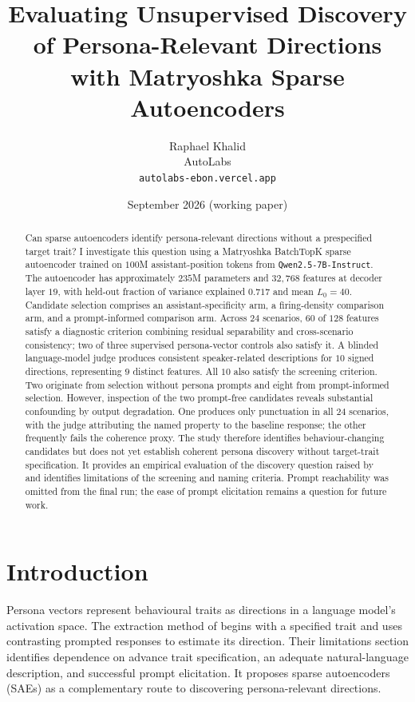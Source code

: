 \documentclass[11pt]{article}
\title{\textbf{Evaluating Unsupervised Discovery of Persona-Relevant Directions\\with Matryoshka Sparse Autoencoders}}
\author{Raphael Khalid \\ \small AutoLabs \\ \small \texttt{autolabs-ebon.vercel.app}}
\date{September 2026 (working paper)}
\begin{document}
\maketitle

\begin{abstract}
Can sparse autoencoders identify persona-relevant directions without a
prespecified target trait? I investigate this question using a Matryoshka
BatchTopK sparse autoencoder trained on $100$M assistant-position tokens from
\texttt{Qwen2.5-7B-Instruct}. The autoencoder has approximately $235$M parameters
and $32{,}768$ features at decoder layer $19$, with held-out fraction of variance
explained $0.717$ and mean $L_0=40$. Candidate selection comprises an
assistant-specificity arm, a firing-density comparison arm, and a prompt-informed
comparison arm. Across $24$ scenarios, $60$ of $128$ features satisfy a diagnostic
criterion combining residual separability and cross-scenario consistency; two of
three supervised persona-vector controls also satisfy it. A blinded language-model
judge produces consistent speaker-related descriptions for $10$ signed directions,
representing $9$ distinct features. All $10$ also satisfy the screening criterion.
Two originate from selection without persona prompts and eight from
prompt-informed selection. However, inspection of the two prompt-free candidates
reveals substantial confounding by output degradation. One produces only
punctuation in all $24$ scenarios, with the judge attributing the named property
to the baseline response; the other frequently fails the coherence proxy.
The study therefore identifies behaviour-changing candidates but does not yet
establish coherent persona discovery without target-trait specification. It
provides an empirical evaluation of the discovery question raised by
\citet{chen2025persona} and identifies limitations of the screening and naming
criteria. Prompt reachability was omitted from the final run; the ease of prompt
elicitation remains a question for future work.
\end{abstract}

\section{Introduction}
Persona vectors represent behavioural traits as directions in a language model's
activation space. The extraction method of \citet{chen2025persona} begins with a
specified trait and uses contrasting prompted responses to estimate its direction.
Their limitations section identifies dependence on advance trait specification,
an adequate natural-language description, and successful prompt elicitation. It
proposes sparse autoencoders (SAEs) as a complementary route to discovering
persona-relevant directions.
\end{document}
